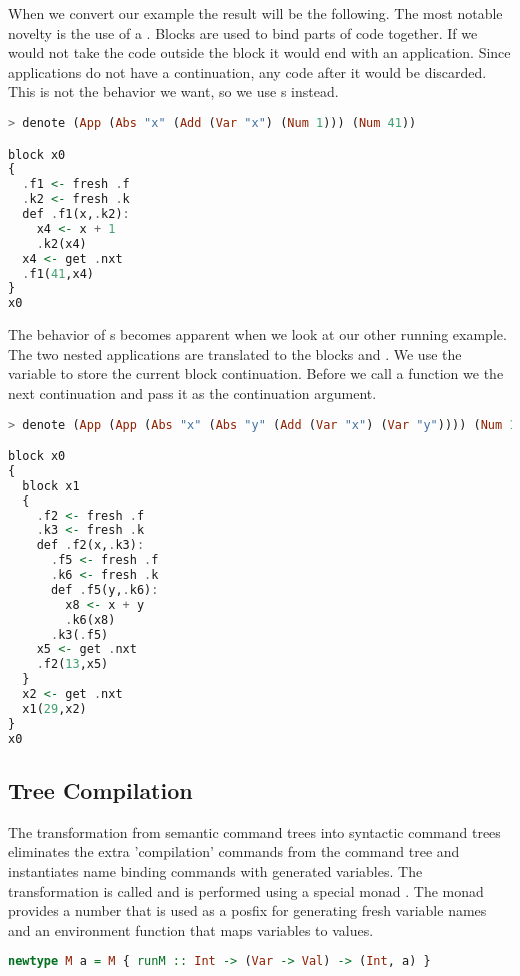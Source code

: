 When we convert our example the result will be the following. The most notable novelty is the use of a . Blocks are used to bind parts of code together. If we would not take the code outside the block it would end with an application. Since applications do not have a continuation, any code after it would be discarded. This is not the behavior we want, so we use s instead.

\begin{lstlisting}[language=Haskell]
> denote (App (Abs "x" (Add (Var "x") (Num 1))) (Num 41))

block x0
{
  .f1 <- fresh .f
  .k2 <- fresh .k
  def .f1(x,.k2):
    x4 <- x + 1
    .k2(x4)
  x4 <- get .nxt
  .f1(41,x4)
}
x0
\end{lstlisting}

The behavior of s becomes apparent when we look at our other running example. The two nested applications are translated to the blocks  and . We use the variable  to store the current block continuation. Before we call a function we  the next continuation and pass it as the continuation argument.

\begin{lstlisting}[language=Haskell]
> denote (App (App (Abs "x" (Abs "y" (Add (Var "x") (Var "y")))) (Num 13)) (Num 29))

block x0
{
  block x1
  {
    .f2 <- fresh .f
    .k3 <- fresh .k
    def .f2(x,.k3):
      .f5 <- fresh .f
      .k6 <- fresh .k
      def .f5(y,.k6):
        x8 <- x + y
        .k6(x8)
      .k3(.f5)
    x5 <- get .nxt
    .f2(13,x5)
  }
  x2 <- get .nxt
  x1(29,x2)
}
x0
\end{lstlisting}

\subsection{\label{subsection:semtosyn}Tree Compilation}
The transformation from semantic command trees into syntactic command trees eliminates the extra 'compilation' commands from the command tree and instantiates name binding commands with generated variables. The transformation is called  and is performed using a special monad . The monad  provides a number that is used as a posfix for generating fresh variable names and an environment function that maps variables to values. 

\begin{lstlisting}[language=Haskell]
newtype M a = M { runM :: Int -> (Var -> Val) -> (Int, a) }
\end{lstlisting}

